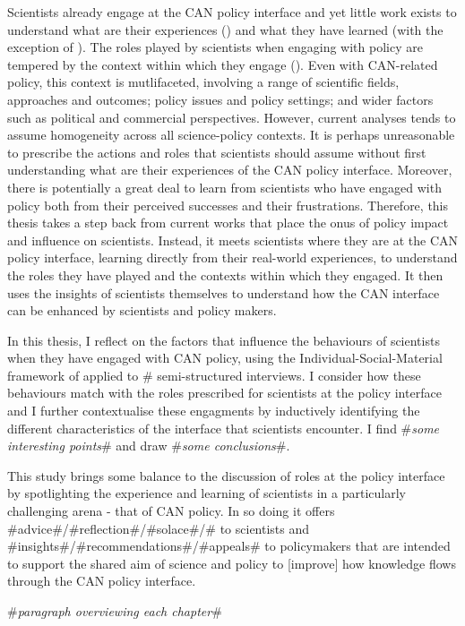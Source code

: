 Scientists already engage at the CAN policy interface and yet little work exists to understand what are their experiences (\cite{KennyRHTB2017}) and what they have learned (with the exception of \cite{Obermeister2022}). The roles played by scientists when engaging with policy are tempered by the context within which they engage (\cite{EdlerKB2022}). Even with CAN-related policy, this context is mutlifaceted, involving a range of scientific fields, approaches and outcomes; policy issues and policy settings; and wider factors such as political and commercial perspectives. However, current analyses tends to assume homogeneity across all science-policy contexts. It is perhaps unreasonable to prescribe the actions and roles that scientists should assume without first understanding what are their experiences of the CAN policy interface. Moreover, there is potentially a great deal to learn from scientists who have engaged with policy both from their perceived successes and their frustrations. Therefore, this thesis takes a step back from current works that place the onus of policy impact and influence on scientists. Instead, it meets scientists where they are at the CAN policy interface, learning directly from their real-world experiences, to understand the roles they have played and the contexts within which they engaged. It then uses the insights of scientists themselves to understand how the CAN interface can be enhanced by scientists and policy makers.


In this thesis, I reflect on the factors that influence the behaviours of scientists when they have engaged with CAN policy, using the Individual-Social-Material framework of \textcite{DarntonH2013} applied to \# semi-structured interviews. I consider how these behaviours match with the roles prescribed for scientists at the policy interface and I further contextualise these engagments by inductively identifying the different characteristics of the interface that scientists encounter. I find \#\emph{some interesting points}\# and draw \#\emph{some conclusions}\#. 

This study brings some balance to the discussion of roles at the policy interface by spotlighting the experience and learning of scientists in a particularly challenging arena - that of CAN policy. In so doing it offers \#advice\#/\#reflection\#/\#solace\#/\# to scientists and \#insights\#/\#recommendations\#/\#appeals\# to policymakers that are intended to support the shared aim of science and policy to [improve] how knowledge flows through the CAN policy interface.

\#\emph{paragraph overviewing each chapter}\#


